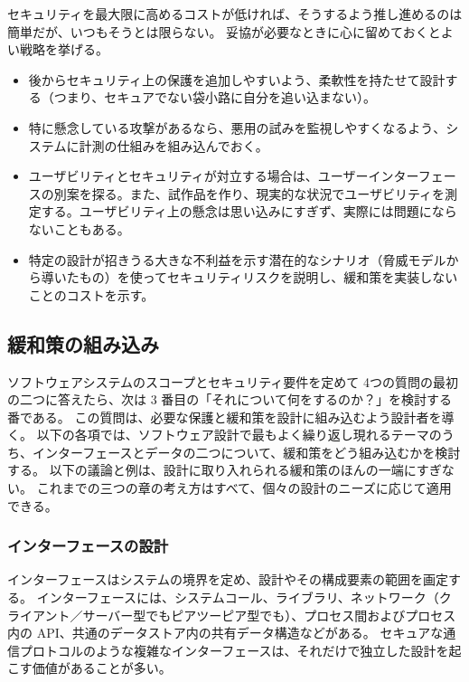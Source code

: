 \documentclass[uplatex]{jsarticle}
\def\label#1{}%
\begin{document}
セキュリティを最大限に高めるコストが低ければ、そうするよう推し進めるのは簡単だが、いつもそうとは限らない。
妥協が必要なときに心に留めておくとよい戦略を挙げる。
\begin{itemize}
\item 後からセキュリティ上の保護を追加しやすいよう、柔軟性を持たせて設計する（つまり、セキュアでない袋小路に自分を追い込まない）。
\item 特に懸念している攻撃があるなら、悪用の試みを監視しやすくなるよう、システムに計測の仕組みを組み込んでおく。
\item ユーザビリティとセキュリティが対立する場合は、ユーザーインターフェースの別案を探る。また、試作品を作り、現実的な状況でユーザビリティを測定する。ユーザビリティ上の懸念は思い込みにすぎず、実際には問題にならないこともある。
\item 特定の設計が招きうる大きな不利益を示す潜在的なシナリオ（脅威モデルから導いたもの）を使ってセキュリティリスクを説明し、緩和策を実装しないことのコストを示す。
\end{itemize}

\subsection{緩和策の組み込み}\label{subsec:ch6-building-in-mitigations}

ソフトウェアシステムのスコープとセキュリティ要件を定めて 4つの質問の最初の二つに答えたら、次は 3 番目の「それについて何をするのか？」を検討する番である。
この質問は、必要な保護と緩和策を設計に組み込むよう設計者を導く。
以下の各項では、ソフトウェア設計で最もよく繰り返し現れるテーマのうち、インターフェースとデータの二つについて、緩和策をどう組み込むかを検討する。
以下の議論と例は、設計に取り入れられる緩和策のほんの一端にすぎない。
これまでの三つの章の考え方はすべて、個々の設計のニーズに応じて適用できる。

\subsubsection{インターフェースの設計}\label{subsec:ch6-designing-interfaces}

インターフェースはシステムの境界を定め、設計やその構成要素の範囲を画定する。
インターフェースには、システムコール、ライブラリ、ネットワーク（クライアント／サーバー型でもピアツーピア型でも）、プロセス間およびプロセス内の API、共通のデータストア内の共有データ構造などがある。
セキュアな通信プロトコルのような複雑なインターフェースは、それだけで独立した設計を起こす価値があることが多い。
\end{document}
